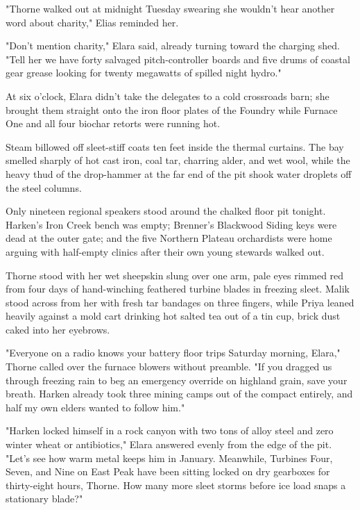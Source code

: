 "Thorne walked out at midnight Tuesday swearing she wouldn't hear another word about charity," Elias reminded her.

"Don't mention charity," Elara said, already turning toward the charging shed. "Tell her we have forty salvaged pitch-controller boards and five drums of coastal gear grease looking for twenty megawatts of spilled night hydro."

\bigskip

At six o'clock, Elara didn't take the delegates to a cold crossroads barn; she brought them straight onto the iron floor plates of the Foundry while Furnace One and all four biochar retorts were running hot.

Steam billowed off sleet-stiff coats ten feet inside the thermal curtains. The bay smelled sharply of hot cast iron, coal tar, charring alder, and wet wool, while the heavy thud of the drop-hammer at the far end of the pit shook water droplets off the steel columns.

Only nineteen regional speakers stood around the chalked floor pit tonight. Harken's Iron Creek bench was empty; Brenner's Blackwood Siding keys were dead at the outer gate; and the five Northern Plateau orchardists were home arguing with half-empty clinics after their own young stewards walked out.

Thorne stood with her wet sheepskin slung over one arm, pale eyes rimmed red from four days of hand-winching feathered turbine blades in freezing sleet. Malik stood across from her with fresh tar bandages on three fingers, while Priya leaned heavily against a mold cart drinking hot salted tea out of a tin cup, brick dust caked into her eyebrows.

"Everyone on a radio knows your battery floor trips Saturday morning, Elara," Thorne called over the furnace blowers without preamble. "If you dragged us through freezing rain to beg an emergency override on highland grain, save your breath. Harken already took three mining camps out of the compact entirely, and half my own elders wanted to follow him."

"Harken locked himself in a rock canyon with two tons of alloy steel and zero winter wheat or antibiotics," Elara answered evenly from the edge of the pit. "Let's see how warm metal keeps him in January. Meanwhile, Turbines Four, Seven, and Nine on East Peak have been sitting locked on dry gearboxes for thirty-eight hours, Thorne. How many more sleet storms before ice load snaps a stationary blade?"

